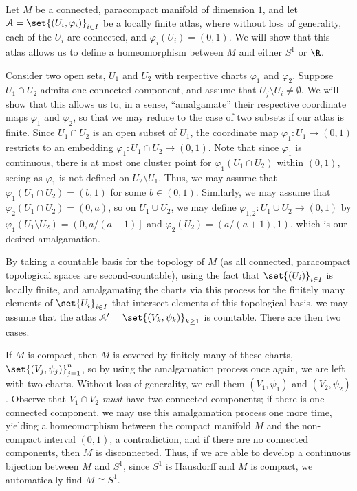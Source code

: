 \documentclass[10pt]{mypackage}
\begin{document}
\begin{solution}
  Let $M$ be a connected, paracompact manifold of dimension $1$, and let $\mathcal{A} = \set{\left( U_i,\varphi_i \right)}_{i\in I}$ be a locally finite atlas, where without loss of generality, each of the $U_i$ are connected, and $\varphi_i\left( U_i \right) = (0,1)$. We will show that this atlas allows us to define a homeomorphism between $M$ and either $S^{1}$ or $\R$.\newline

  Consider two open sets, $U_1$ and $U_2$ with respective charts $\varphi_1$ and $\varphi_2$. Suppose $U_1\cap U_2$ admits one connected component, and assume that $U_j\setminus U_i\neq \emptyset$. We will show that this allows us to, in a sense, ``amalgamate'' their respective coordinate maps $\varphi_1$ and $\varphi_2$, so that we may reduce to the case of two subsets if our atlas is finite. Since $U_1\cap U_2$ is an open subset of $U_1$, the coordinate map $\varphi_1\colon U_1\rightarrow (0,1)$ restricts to an embedding $\varphi_1\colon U_1\cap U_2\rightarrow (0,1)$. Note that since $\varphi_{1}$ is continuous, there is at most one cluster point for $\varphi_1\left( U_1\cap U_2 \right)$ within $(0,1)$, seeing as $\varphi_1$ is not defined on $U_2\setminus U_1$. Thus, we may assume that $\varphi_{1}\left( U_1\cap U_2 \right) = (b,1)$ for some $b\in (0,1)$. Similarly, we may assume that $\varphi_2\left( U_1\cap U_2 \right) = (0,a)$, so on $U_1\cup U_2$, we may define $\varphi_{1,2}\colon U_1\cup U_2\rightarrow (0,1)$ by $\varphi_{1}\left( U_1\setminus U_2 \right) = \left(0,a/(a+1)\right]$ and $\varphi_{2}\left( U_2 \right) = \left(a/(a+1),1\right)$, which is our desired amalgamation.\newline

  By taking a countable basis for the topology of $M$ (as all connected, paracompact topological spaces are second-countable), using the fact that $\set{\left( U_i \right)}_{i\in I}$ is locally finite, and amalgamating the charts via this process for the finitely many elements of $\set{U_i}_{i\in I}$ that intersect elements of this topological basis, we may assume that the atlas $\mathcal{A}' = \set{\left( V_k,\psi_k \right)}_{k\geq 1}$ is countable. There are then two cases.\newline

  If $M$ is compact, then $M$ is covered by finitely many of these charts, $\set{\left( V_j,\psi_j \right)}_{j=1}^{n}$, so by using the amalgamation process once again, we are left with two charts. Without loss of generality, we call them $\left( V_1,\psi_1 \right)$ and $\left( V_2,\psi_2 \right)$. Observe that $V_1\cap V_2$  \textit{must} have two connected components; if there is one connected component, we may use this amalgamation process one more time, yielding a homeomorphism between the compact manifold $M$ and the non-compact interval $\left( 0,1 \right)$, a contradiction, and if there are no connected components, then $M$ is disconnected. Thus, if we are able to develop a continuous bijection between $M$ and $S^{1}$, since $S^{1}$ is Hausdorff and $M$ is compact, we automatically find $M\cong S^{1}$.\newline


\end{solution}
\end{document}
